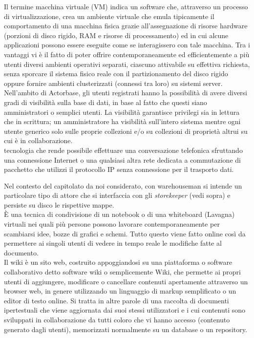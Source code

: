 \documentclass{scalatekids-article}
\begin{document}
   Il termine macchina virtuale (VM) indica un software che, attraverso un processo di virtualizzazione, crea un ambiente virtuale che emula tipicamente il comportamento di una macchina fisica grazie all'assegnazione di risorse hardware (porzioni di disco rigido, RAM e risorse di processamento) ed in cui alcune applicazioni possono essere eseguite come se interagissero con tale macchina.
  Tra i vantaggi vi è il fatto di poter offrire contemporaneamente ed efficientemente a più utenti diversi ambienti operativi separati, ciascuno attivabile su effettiva richiesta, senza sporcare il sistema fisico reale con il partizionamento del disco rigido oppure fornire ambienti clusterizzati (connessi tra loro) su sistemi server.
  \\

   Nell'ambito di Actorbase, gli utenti registrati hanno la possibilità di avere diversi gradi di visibilità sulla base di dati, in base al fatto che questi siano amministratori o semplici utenti.
  La visibilità garantisce privilegi sia in lettura che in scrittura; un amministratore ha visibilità sull'intero sistema mentre ogni utente generico solo sulle proprie collezioni e/o su collezioni di proprietà altrui su cui è in collaborazione.
  \\

   tecnologia che rende possibile effettuare una conversazione telefonica sfruttando una connessione Internet o una qualsiasi altra rete dedicata a commutazione di pacchetto che utilizzi il protocollo IP senza connessione per il trasporto dati.
  \\


   Nel contesto del capitolato da noi considerato, con warehouseman si intende un particolare tipo di attore che si interfaccia con gli \textit{storekeeper} (vedi sopra) e persiste su disco le rispettive mappe.
  \\

   È una tecnica di condivisione di un notebook o di una whiteboard (Lavagna) virtuali nei quali più persone possono lavorare contemporaneamente per scambiarsi idee, bozze di grafici e schemi.
  Tutto questo viene fatto online così da permettere ai singoli utenti di vedere in tempo reale le modifiche fatte al documento.
  \\

   Il wiki è un sito web, costruito appoggiandosi su una piattaforma o software collaborativo detto software wiki o semplicemente Wiki, che permette ai propri utenti di aggiungere, modificare o cancellare contenuti apertamente attraverso un browser web, in genere utilizzando un linguaggio di markup semplificato o un editor di testo online.
  Si tratta in altre parole di una raccolta di documenti ipertestuali che viene aggiornata dai suoi stessi utilizzatori e i cui contenuti sono sviluppati in collaborazione da tutti coloro che vi hanno accesso (contenuto generato dagli utenti), memorizzati normalmente su un database o un repository.
  \\



\end{document}
